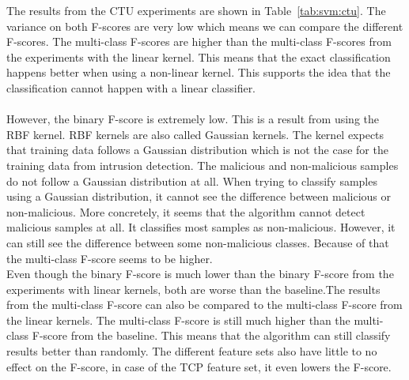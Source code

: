 \noindent The results from the CTU experiments are shown in Table~\ref{tab:svm:ctu}. The variance on both F-scores are very low which means we can compare the different F-scores. The multi-class F-scores are higher than the multi-class F-scores from the experiments with the linear kernel. This means that the exact classification happens better when using a non-linear kernel. This supports the idea that the classification cannot happen with a linear classifier. \\
\\
However, the binary F-score is extremely low. This is a result from using the RBF kernel. RBF kernels are also called Gaussian kernels. The kernel expects that training data follows a Gaussian distribution which is not the case for the training data from intrusion detection. The malicious and non-malicious samples do not follow a Gaussian distribution at all. When trying to classify samples using a Gaussian distribution, it cannot see the difference between malicious or non-malicious. More concretely, it seems that the algorithm cannot detect malicious samples at all. It classifies most samples as non-malicious. However, it can still see the difference between some non-malicious classes. Because of that the multi-class F-score seems to be higher. \\
Even though the binary F-score is much lower than the binary F-score from the experiments with linear kernels, both are worse than the baseline.The results from the multi-class F-score can also be compared to the multi-class F-score from the linear kernels. The multi-class F-score is still much higher than the multi-class F-score from the baseline. This means that the algorithm can still classify results better than randomly. The different feature sets also have little to no effect on the F-score, in case of the TCP feature set, it even lowers the F-score. 

